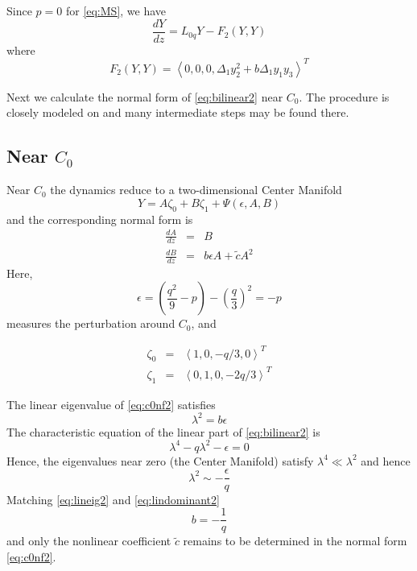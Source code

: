 Since $p=0$ for \eqref{eq:MS}, we have 
\begin{equation} \label{eq:bilinear2}
 \frac{ dY }{ dz } = L_{0q} Y - F_2(Y,Y) 
\end{equation}
where 
\begin{equation}\label{eq:nonlinear2}
F_2(Y,Y) = \left<0,0,0,\Delta_1 y_2^2 + b \Delta_1 y_1 y_3 \right>^T
\end{equation}

Next we calculate the normal form of \eqref{eq:bilinear2} near $C_0$. The procedure is
closely modeled on \cite{IA} and many intermediate steps may be found there. 

\subsection{ Near $C_0$ }
Near $C_0$ the dynamics reduce to a two-dimensional Center Manifold
\begin{equation}\label{eq:c0cm2}
 Y = A \zeta_0 + B \zeta_1 + \Psi(\epsilon,A,B)
\end{equation}
and the corresponding normal form is
\begin{subequations}\label{eq:c0nf2}
\begin{eqnarray}
\frac{dA}{dz} &=& B \label{eq:c0nf2a} \\
\frac{dB}{dz} &=& b \epsilon A + \tilde{c} A^2 \label{eq:c0nf2b}
\end{eqnarray}
\end{subequations}
Here,
\begin{equation}
\epsilon = \left( \frac{q^2}{9} - p\right) - \left(\frac{q}{3}\right)^2 = - p 
\end{equation}
measures the perturbation around $C_0$, and

\begin{subequations}\label{eq:lineareigs2}
\begin{eqnarray}
\zeta_0 &=& \left<1,0,-q/3,0\right>^T\\
\zeta_1 &=& \left<0,1,0,-2 q/3\right>^T 
\end{eqnarray}
\end{subequations}

The linear eigenvalue of \eqref{eq:c0nf2} satisfies 
\begin{equation}\label{eq:lineig2}
\lambda^2 = b \epsilon 
\end{equation}
The characteristic equation of the linear part of 
\eqref{eq:bilinear2} is 
\begin{equation}\label{eq:charlinear2}
\lambda^4 - q \lambda^2 - \epsilon =  0 
\end{equation}
Hence, the eigenvalues near zero (the Center Manifold) satisfy $\lambda^4 \ll \lambda^2$ and hence 
\begin{equation}\label{eq:lindominant2}
\lambda^2 \sim -\frac{\epsilon}{q}
\end{equation}
Matching \eqref{eq:lineig2} and \eqref{eq:lindominant2} 
\begin{equation}
b = - \frac{1}{q}
\end{equation}
and only the nonlinear coefficient $\tilde{c}$ remains to be determined in the normal form \eqref{eq:c0nf2}.

